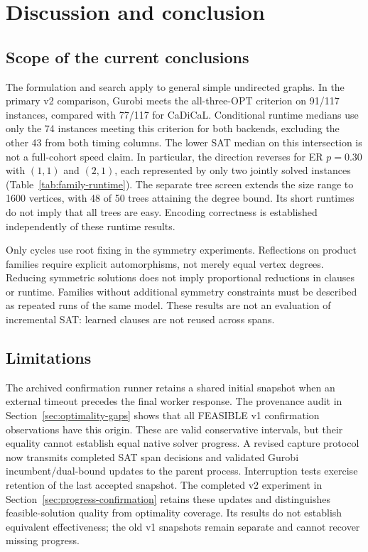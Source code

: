 \section{Discussion and conclusion}
\subsection{Scope of the current conclusions}
The formulation and search apply to general simple undirected graphs.
In the primary v2 comparison, Gurobi meets the all-three-OPT criterion
on 91/117 instances, compared with 77/117 for CaDiCaL. Conditional
runtime medians use only the 74 instances meeting this criterion for
both backends, excluding the other 43 from both timing columns.
The lower SAT median on this intersection is not a full-cohort speed
claim. In particular, the direction reverses for ER $p=0.30$ with
$(1,1)$ and $(2,1)$, each represented by only two jointly solved
instances (Table~\ref{tab:family-runtime}). The separate tree screen
extends the size range to 1600 vertices, with 48 of 50 trees attaining
the degree bound. Its short runtimes do not imply that all trees are easy.
Encoding correctness is established independently of these runtime results.

Only cycles use root fixing in the symmetry experiments. Reflections on
product families require explicit automorphisms, not merely equal vertex
degrees. Reducing symmetric solutions does not imply proportional reductions
in clauses or runtime. Families without additional symmetry constraints
must be described as repeated runs of the same model. These results are
not an evaluation of incremental SAT: learned clauses are not reused across spans.

\subsection{Limitations}
The archived confirmation runner retains a shared initial snapshot when an external
timeout precedes the final worker response. The provenance audit in
Section~\ref{sec:optimality-gaps} shows that all FEASIBLE v1 confirmation
observations have this origin. These are valid conservative intervals, but
their equality cannot establish equal native solver progress. A revised
capture protocol now transmits completed SAT span decisions and validated
Gurobi incumbent/dual-bound updates to the parent process. Interruption tests
exercise retention of the last accepted snapshot. The completed v2 experiment in Section~\ref{sec:progress-confirmation}
retains these updates and distinguishes feasible-solution quality from
optimality coverage. Its results do not establish equivalent effectiveness;
the old v1 snapshots remain separate and cannot recover missing progress.

